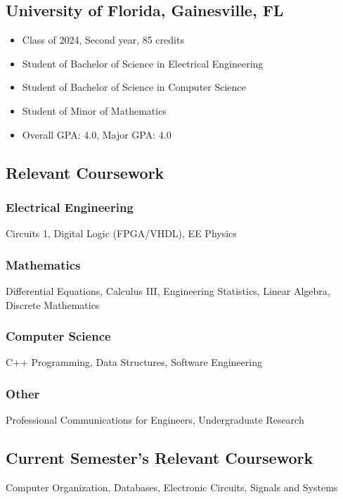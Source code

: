 \documentclass{article}
\newcommand\halftextbox[1]{%
  \parbox[t]{.475\textwidth}{#1}%
}
\newcommand\spacetextbox[1]{%
  \parbox{.05\textwidth}{#1}%
}
\newenvironment{CustomItemize}
{ \begin{itemize}[leftmargin=1em]
    \setlength{\itemsep}{0pt}
    \setlength{\parskip}{0pt}
    \setlength{\parindent}{0pt}
    \setlength{\parsep}{0pt}     }
{ \end{itemize}                  }
\begin{document}
\noindent
\halftextbox{
\begin{raggedright}
\subsection{University of Florida,  Gainesville, FL}
\begin{CustomItemize}
\item Class of 2024, Second year, 85 credits
\item Student of Bachelor of Science in Electrical Engineering
\item Student of Bachelor of Science in Computer Science
\item Student of Minor of Mathematics
\item Overall GPA: 4.0, Major GPA: 4.0
\end{CustomItemize}

\subsection{Relevant Coursework}
\subsubsection{Electrical Engineering}
Circuits 1,
Digital Logic (FPGA/VHDL),
EE Physics
\end{raggedright}
}
\spacetextbox{\hfil\hfil}
\halftextbox{
\begin{raggedright}
\subsubsection{Mathematics}
Differential Equations, 
Calculus III,
Engineering Statistics, 
Linear Algebra,
Discrete Mathematics

\subsubsection{Computer Science}
C++ Programming,
Data Structures,
Software Engineering

\subsubsection{Other}
Professional Communications for Engineers,
Undergraduate Research

\subsection{Current Semester's Relevant Coursework}
Computer Organization,
Databases,
Electronic Circuits,
Signals and Systems
\end{raggedright}
}
\end{document}
